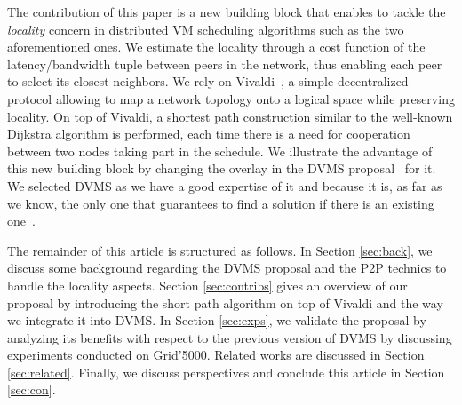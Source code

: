 The contribution of this paper is a new building block that enables to tackle the
\emph{locality} concern in distributed VM scheduling algorithms such as the two
aforementioned ones.
We estimate the locality through a cost function of the latency/bandwidth tuple between
peers in the network, thus enabling each peer to select its closest neighbors. We rely on
Vivaldi~\cite{dabek:2001:sigcomm04}, a simple decentralized protocol allowing to map a
network topology onto a logical space while preserving locality. On top of Vivaldi, a shortest path
construction similar to the well-known Dijkstra algorithm is performed, each time there is
a need for cooperation between two nodes taking part in the schedule. We illustrate the
advantage of this new building block by changing the overlay in the DVMS
proposal~\cite{quesnel:cpe2012} for it. We selected DVMS as we have a good expertise of it and
because it is, as far as we know, the only one that guarantees to find a solution if there
is an existing one~\cite{quesnel:ispa2013}.
                                                   
The remainder of this article is structured as follows. In Section \ref{sec:back}, we
discuss some background regarding the DVMS proposal and the P2P technics to handle
the locality aspects. Section \ref{sec:contribs} gives an overview of our proposal by
introducing the short path algorithm on top of Vivaldi and the way we integrate it into
DVMS. In Section \ref{sec:exps}, we validate the proposal by analyzing its benefits with
respect to the previous version of DVMS by discussing experiments conducted on
Grid'5000. Related works are discussed in Section \ref{sec:related}. Finally, we discuss
perspectives and conclude this article in Section \ref{sec:con}.

